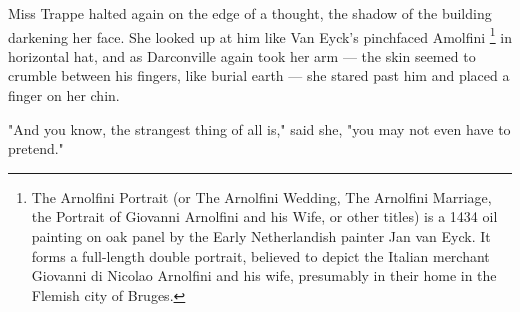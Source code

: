   Miss Trappe halted again on the edge of a thought, the shadow of the building
darkening her face. She looked up at him like Van Eyck's pinchfaced Amolfini 
\footnote{ The Arnolfini Portrait (or The Arnolfini Wedding, The Arnolfini
Marriage, the Portrait of Giovanni Arnolfini and his Wife, or other titles) is a
1434 oil painting on oak panel by the Early Netherlandish painter Jan van Eyck.
It forms a full-length double portrait, believed to depict the Italian merchant
Giovanni di Nicolao Arnolfini and his wife, presumably in their home in the
Flemish city of Bruges.
}
in horizontal hat, and as Darconville again took her arm --- the skin seemed to 
crumble between his fingers, like burial earth --- she stared past him and 
placed a finger on her chin.

  "And you know, the strangest thing of all is," said she, "you may not even
have to pretend."

